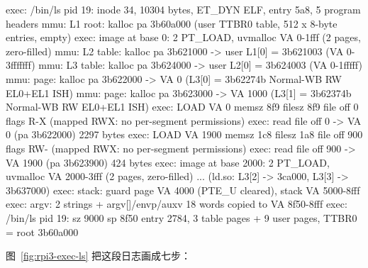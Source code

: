 \begin{txtcode}
exec: /bin/ls pid 19: inode 34, 10304 bytes, ET_DYN ELF, entry 5a8, 5 program headers
mmu:   L1 root: kalloc pa 3b60a000 (user TTBR0 table, 512 x 8-byte entries, empty)
exec:   image at base 0: 2 PT_LOAD, uvmalloc VA 0-1fff (2 pages, zero-filled)
mmu:   L2 table: kalloc pa 3b621000 -> user L1[0] = 3b621003 (VA 0-3fffffff)
mmu:   L3 table: kalloc pa 3b624000 -> user L2[0] = 3b624003 (VA 0-1fffff)
mmu:   page: kalloc pa 3b622000 -> VA 0 (L3[0] = 3b62274b Normal-WB RW EL0+EL1 ISH)
mmu:   page: kalloc pa 3b623000 -> VA 1000 (L3[1] = 3b62374b Normal-WB RW EL0+EL1 ISH)
exec:   LOAD VA 0 memsz 8f9 filesz 8f9 file off 0 flags R-X (mapped RWX: no per-segment permissions)
exec:   read file off 0 -> VA 0 (pa 3b622000) 2297 bytes
exec:   LOAD VA 1900 memsz 1c8 filesz 1a8 file off 900 flags RW- (mapped RWX: no per-segment permissions)
exec:   read file off 900 -> VA 1900 (pa 3b623900) 424 bytes
exec:   image at base 2000: 2 PT_LOAD, uvmalloc VA 2000-3fff (2 pages, zero-filled)
   ...  (ld.so: L3[2] -> 3ca000, L3[3] -> 3b637000)
exec:   stack: guard page VA 4000 (PTE_U cleared), stack VA 5000-8fff
exec:   argv: 2 strings + argv[]/envp/auxv 18 words copied to VA 8f50-8fff
exec: /bin/ls pid 19: sz 9000 sp 8f50 entry 2784, 3 table pages + 9 user pages, TTBR0 = root 3b60a000
\end{txtcode}

图~\ref{fig:rpi3-exec-ls} 把这段日志画成七步：

